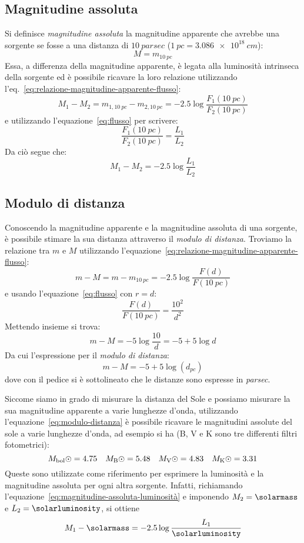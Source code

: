 \subsection{Magnitudine assoluta}\label{sec:magnitudine-assoluta}
Si definisce \emph{magnitudine assoluta} la magnitudine apparente che avrebbe una sorgente se fosse a una distanza di $\SI{10}{parsec}$ ($\SI{1}{pc} = \SI{3.086e18}{cm}$):
\begin{equation}\label{eq:magnitudine-assoluta}
    M = m_{\SI{10}{pc}}
\end{equation}
Essa, a differenza della magnitudine apparente, è legata alla luminosità intrinseca della sorgente ed è possibile ricavare la loro relazione utilizzando l'eq.~\eqref{eq:relazione-magnitudine-apparente-flusso}:
\[
    M_1 - M_2 = m_{1, \SI{10}{pc}} - m_{2, \SI{10}{pc}} = -2.5 \log\frac{F_1 (\SI{10}{pc})}{F_2 (\SI{10}{pc})}
\]
e utilizzando l'equazione~\eqref{eq:flusso} per scrivere:
\[
    \frac{F_1 (\SI{10}{pc})}{F_2 (\SI{10}{pc})} = \frac{L_1}{L_2}
\]
Da ciò segue che:
\begin{equation}\label{eq:magnitudine-assoluta-luminosità}
    M_1 - M_2 = -2.5 \log\frac{L_1}{L_2}
\end{equation}

\subsection{Modulo di distanza}
Conoscendo la magnitudine apparente e la magnitudine assoluta di una sorgente, è possibile stimare la sua distanza attraverso il \emph{modulo di distanza}. Troviamo la relazione tra $m$ e $M$ utilizzando l'equazione~\eqref{eq:relazione-magnitudine-apparente-flusso}:
\[
    m - M = m - m_{\SI{10}{pc}} = -2.5 \log\frac{F(d)}{F(\SI{10}{pc})}
\]
e usando l'equazione~\eqref{eq:flusso} con $r=d$:
\[
    \frac{F(d)}{F(\SI{10}{pc})} = \frac{10^2}{d^2}
\]
Mettendo insieme si trova:
\[
    m - M = -5 \log\frac{10}{d} = -5 + 5 \log d
\]
Da cui l'espressione per il \emph{modulo di distanza}:
\begin{equation}\label{eq:modulo-distanza}
    m - M = -5 + 5 \log(d_{\si{pc}})
\end{equation}
dove con il pedice si è sottolineato che le distanze sono espresse in \emph{parsec}.

Siccome siamo in grado di misurare la distanza del Sole e possiamo misurare la sua magnitudine apparente a varie lunghezze d'onda, utilizzando l'equazione~\eqref{eq:modulo-distanza} è possibile ricavare le magnitudini assolute del sole a varie lunghezze d'onda, ad esempio si ha (B, V e K sono tre differenti filtri fotometrici):
\[
    M_\ensuremath{\textup{bol}\odot} = 4.75 \quad M_\ensuremath{\textup{B}\odot} = 5.48 \quad M_\ensuremath{\textup{V}\odot} = 4.83 \quad M_\ensuremath{\textup{K}\odot} = 3.31
\]
Queste sono utilizzate come riferimento per esprimere la luminosità e la magnitudine assoluta per ogni altra sorgente. Infatti, richiamando l'equazione~\eqref{eq:magnitudine-assoluta-luminosità} e imponendo $M_2 = \si{\solarmass}$ e $L_2 = \si{\solarluminosity}$, si ottiene
\begin{equation}\label{eq:magnitudine-assoluta-luminosità-sole}
    M_1 - \si{\solarmass} = -2.5 \log\frac{L_1}{\si{\solarluminosity}}
\end{equation}